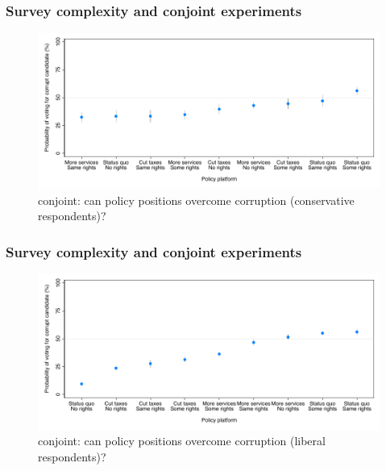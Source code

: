 \documentclass[usenames,dvipsnames]{beamer}
\begin{document}
\begin{frame}
\frametitle{Survey complexity and conjoint experiments}

\begin{figure}[!hb]
\hspace*{-11mm}
\includegraphics[scale = 0.77]{../figs/fz_margins_right.pdf}
\vspace{0.2cm}
\caption{\citet{franchino2015voting} conjoint: can policy positions overcome corruption (conservative respondents)?}
\small
\vspace{-0.3cm}
\label{fig: fz_margins_right}
\end{figure}

\end{frame}

\begin{frame}
\frametitle{Survey complexity and conjoint experiments}


\begin{figure}[!hb]
\hspace*{-11mm}
\includegraphics[scale = 0.77]{../figs/fz_margins_left.pdf}
\vspace{0.2cm}
\caption{\citet{franchino2015voting} conjoint: can policy positions overcome corruption (liberal respondents)?}
\small
\vspace{-0.5cm}
\label{fig: fz_margins_left}
\end{figure}

\end{frame}
\end{document}

